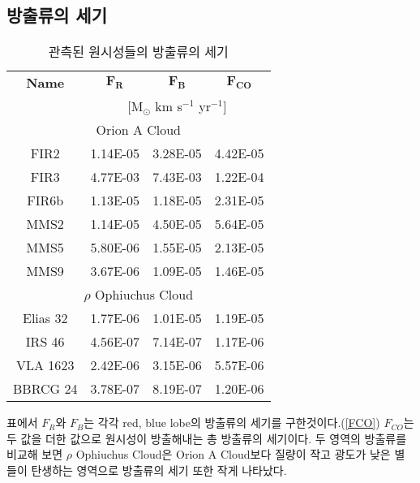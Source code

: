 \subsection{방출류의 세기}
\begin{table}[h]
	\begin{center}
		\begin{tabular}{c|c|c|c}
			\toprule
			\textbf{Name} &$\mathbf{F_{R}}$ & $\mathbf{F_{B}}$ & $\mathbf{F_{CO}}$\\
			& \multicolumn{3}{c}{[M$_{\odot}$ km s$^{-1}$ yr$^{-1}$]}\\
			\midrule
			\multicolumn{4}{c}{Orion A Cloud}\\
			\midrule
			FIR2 & 1.14E-05 & 3.28E-05 & 4.42E-05\\
			FIR3 & 4.77E-03 & 7.43E-03 & 1.22E-04\\
			FIR6b & 1.13E-05 & 1.18E-05 & 2.31E-05\\
			MMS2 & 1.14E-05 & 4.50E-05 & 5.64E-05\\
			MMS5 & 5.80E-06 & 1.55E-05 & 2.13E-05\\
			MMS9 & 3.67E-06 & 1.09E-05 & 1.46E-05\\
			\midrule
			\multicolumn{4}{c}{$\rho$ Ophiuchus Cloud}\\
			\midrule
			Elias 32 & 1.77E-06 & 1.01E-05 & 1.19E-05\\
			IRS 46 & 4.56E-07 & 7.14E-07 & 1.17E-06\\
			VLA 1623 & 2.42E-06 & 3.15E-06 & 5.57E-06\\
			BBRCG 24 & 3.78E-07 & 8.19E-07 & 1.20E-06\\
		\end{tabular}
	\end{center}
	\caption{관측된 원시성들의 방출류의 세기}
\end{table}

표에서 $F_R$와 $F_B$는 각각 red, blue lobe의 방출류의 세기를 구한것이다.(\ref{FCO}) $F_{CO}$는 두 값을 더한 값으로 원시성이 방출해내는 총 방출류의 세기이다. 두 영역의 방출류를 비교해 보면 $\rho$ Ophiuchus Cloud은 Orion A Cloud보다 질량이 작고 광도가 낮은 별들이 탄생하는 영역으로 방출류의 세기 또한 작게 나타났다.\\
